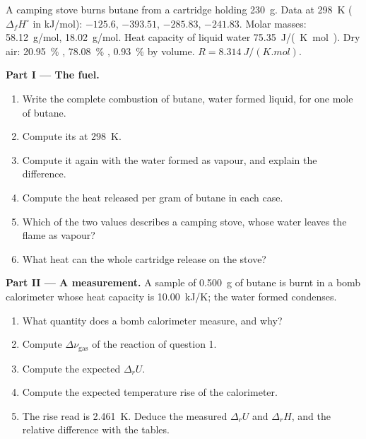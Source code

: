 \begin{problem}
\label{pb:b2:reaction-enthalpy:1}
A camping stove burns butane from a cartridge holding \qty{230}{g}.
Data at \qty{298}{K} ($\Delta_f H^\circ$ in \unit{kJ/mol}): 
$-125.6$,  $-393.51$,  $-285.83$, 
$-241.83$. Molar masses:  \qty{58.12}{g/mol}, 
\qty{18.02}{g/mol}. Heat capacity of liquid water
\qty{75.35}{J/(K.mol)}. Dry air: \qty{20.95}{\percent} ,
\qty{78.08}{\percent} , \qty{0.93}{\percent}  by volume. $R = \qty{8.314}{J/(K.mol)}$.

\medskip
\noindent\textbf{Part I --- The fuel.}
\begin{enumerate}
  \item Write the complete combustion of butane, water formed liquid,
        for one mole of butane.
  \item Compute its  at \qty{298}{K}.
  \item Compute it again with the water formed as vapour, and explain the
        difference.
  \item Compute the heat released per gram of butane in each case.
  \item Which of the two values describes a camping stove, whose water
        leaves the flame as vapour?
  \item What heat can the whole cartridge release on the stove?
\end{enumerate}

\medskip
\noindent\textbf{Part II --- A measurement.}
A sample of \qty{0.500}{g} of butane is burnt in a bomb calorimeter whose
heat capacity is \qty{10.00}{kJ/K}; the water formed condenses.
\begin{enumerate}[resume]
  \item What quantity does a bomb calorimeter measure, and why?
  \item Compute $\Delta\nu_{\text{gas}}$ of the reaction of question 1.
  \item Compute the expected $\Delta_r U$.
  \item Compute the expected temperature rise of the calorimeter.
  \item The rise read is \qty{2.461}{K}. Deduce the measured $\Delta_r U$
        and $\Delta_r H$, and the relative difference with the tables.
\end{enumerate}


\end{problem}
